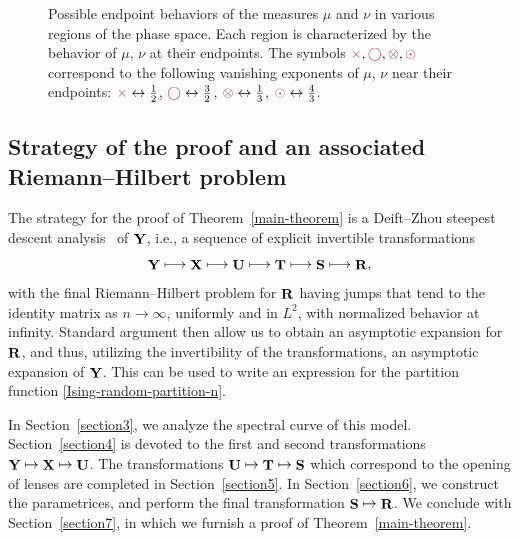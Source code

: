 \documentclass[pdftex]{sigma}
\DeclareMathOperator{\YY}{{\bf Y}}
\DeclareMathOperator{\XX}{{\bf X}}
\DeclareMathOperator{\TT}{{\bf T}}
\DeclareMathOperator{\UU}{{\bf U}}
\DeclareMathOperator{\boldS}{{\bf S}}
\DeclareMathOperator{\boldR}{{\bf R}}
\numberwithin{equation}{section}
\begin{document}
\begin{figure}[!ht]
 \caption{Possible endpoint behaviors of the measures $\mu$ and $\nu$ in various regions of the phase space. Each region is characterized by the behavior of $\mu$, $\nu$ at their endpoints. The symbols $\textcolor{BrickRed}{\times},\textcolor{BrickRed}{\bigcirc}, \textcolor{BrickRed}{\otimes}, \textcolor{BrickRed}{\odot}$ correspond to the following vanishing exponents of $\mu$, $\nu$ near their endpoints: $\textcolor{BrickRed}{\times} \leftrightarrow \frac{1}{2}$, $\textcolor{BrickRed}{\bigcirc} \leftrightarrow \frac{3}{2}$, $\textcolor{BrickRed}{\otimes} \leftrightarrow \frac{1}{3}$, $\textcolor{BrickRed}{\odot} \leftrightarrow \frac{4}{3}$.}
 \label{tab:SpectralCurveCriticalPhenomenon}
\end{figure}



\subsection{Strategy of the proof and an associated Riemann--Hilbert problem}

The strategy for the proof of Theorem~\ref{main-theorem} is a Deift--Zhou steepest descent analysis~\cite{Deift-Zhou} of $\YY$, i.e., a sequence of explicit invertible transformations
 \begin{equation*}
 \YY\longmapsto\XX\longmapsto\UU\longmapsto\TT\longmapsto\boldS\longmapsto\boldR,
 \end{equation*}
with the final Riemann--Hilbert problem for $\boldR$ having jumps that tend
to the identity matrix as $n\to \infty$, uniformly and in $L^2$, with
normalized behavior at infinity. Standard argument then allow us to obtain an asymptotic expansion for $\boldR$, and thus, utilizing the invertibility of the transformations, an asymptotic expansion of $\YY$. This can be used to write an expression for the partition function \eqref{Ising-random-partition-n}.

In Section~\ref{section3}, we analyze the spectral curve of this model. Section~\ref{section4} is devoted to the first and second transformations $\YY\mapsto\XX\mapsto\UU$. The transformations $\UU\mapsto\TT\mapsto\boldS$ which correspond to the opening of lenses are completed in Section~\ref{section5}. In Section~\ref{section6}, we construct the parametrices, and perform the final transformation $\boldS\mapsto\boldR$. We conclude with Section~\ref{section7}, in which we furnish a proof of Theorem~\ref{main-theorem}.
\end{document}
